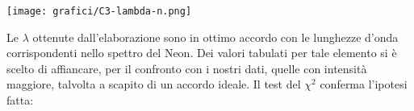 \begin{center}
\end{center}

\begin{center}
\texttt{[image: grafici/C3-lambda-n.png]}
\end{center}




Le $\lambda$ ottenute dall'elaborazione sono in ottimo accordo con le lunghezze d'onda corrispondenti nello spettro del Neon. Dei valori tabulati per tale elemento si è scelto di affiancare, per il confronto con i nostri dati, quelle con intensità maggiore, talvolta a scapito di un accordo ideale. Il test del ${\chi}^2$ conferma l'ipotesi fatta:

